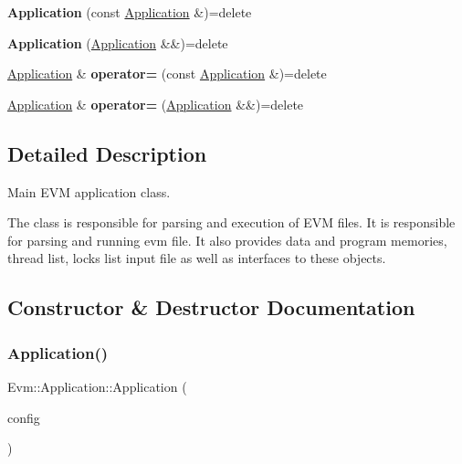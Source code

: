 \begin{DoxyCompactItemize}
\mbox{\label{struct_evm_1_1_application_a0ccd71f9edb98d0255597973a1105d08}} 
{\bfseries Application} (const \mbox{\hyperlink{struct_evm_1_1_application}{Application}} \&)=delete
\item 
\mbox{\label{struct_evm_1_1_application_ad280fab63abb3218d0f7619d4c31359a}} 
{\bfseries Application} (\mbox{\hyperlink{struct_evm_1_1_application}{Application}} \&\&)=delete
\item 
\mbox{\label{struct_evm_1_1_application_a5dc9e3d6c4bddc6d0339d3d12b9a48d8}} 
\mbox{\hyperlink{struct_evm_1_1_application}{Application}} \& {\bfseries operator=} (const \mbox{\hyperlink{struct_evm_1_1_application}{Application}} \&)=delete
\item 
\mbox{\label{struct_evm_1_1_application_a93122a21cf168f84d6ca24f7db680589}} 
\mbox{\hyperlink{struct_evm_1_1_application}{Application}} \& {\bfseries operator=} (\mbox{\hyperlink{struct_evm_1_1_application}{Application}} \&\&)=delete
\end{DoxyCompactItemize}


\subsection{Detailed Description}
Main E\+VM application class. 

The class is responsible for parsing and execution of E\+VM files. It is responsible for parsing and running evm file. It also provides data and program memories, thread list, locks list input file as well as interfaces to these objects. 

\subsection{Constructor \& Destructor Documentation}
\mbox{\label{struct_evm_1_1_application_ac0dcf0cf2c0b1b3e70024a07536534a2}} 
\subsubsection{\texorpdfstring{Application()}{Application()}}
{\footnotesize\ttfamily Evm\+::\+Application\+::\+Application (\begin{DoxyParamCaption}\item[{\mbox{\hyperlink{struct_evm_1_1_cli_configuration}{Cli\+Configuration}} \&}]{config }\end{DoxyParamCaption})}



